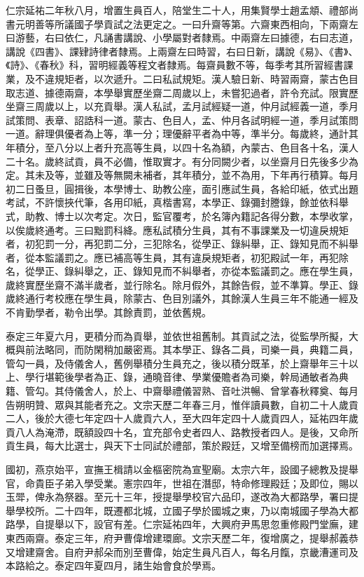 \begin{pinyinscope}
 仁宗延祐二年秋八月，增置生員百人，陪堂生二十人，用集賢學士趙孟頫、禮部尚書元明善等所議國子學貢試之法更定之。一曰升齋等第。六齋東西相向，下兩齋左曰游藝，右曰依仁，凡誦書講說、小學屬對者隸焉。中兩齋左曰據德，右曰志道，講說《四書》、課肄詩律者隸焉。上兩齋左曰時習，右曰日新，講說《易》、《書》、《詩》、《春秋》科，習明經義等程文者隸焉。每齋員數不等，每季考其所習經書課業，及不違規矩者，以次遞升。二曰私試規矩。漢人驗日新、時習兩齋，蒙古色目取志道、據德兩齋，本學舉實歷坐齋二周歲以上，未嘗犯過者，許令充試。限實歷坐齋三周歲以上，以充貢舉。漢人私試，孟月試經疑一道，仲月試經義一道，季月試策問、表章、詔誥科一道。蒙古、色目人，孟、仲月各試明經一道，季月試策問一道。辭理俱優者為上等，準一分；理優辭平者為中等，準半分。每歲終，通計其年積分，至八分以上者升充高等生員，以四十名為額，內蒙古、色目各十名，漢人二十名。歲終試貢，員不必備，惟取實才。有分同闕少者，以坐齋月日先後多少為定。其未及等，並雖及等無闕未補者，其年積分，並不為用，下年再行積算。每月初二日蚤旦，圓揖後，本學博士、助教公座，面引應試生員，各給印紙，依式出題考試，不許懷挾代筆，各用印紙，真楷書寫，本學正、錄彌封謄錄，餘並依科舉式，助教、博士以次考定。次日，監官覆考，於名簿內籍記各得分數，本學收掌，以俟歲終通考。三曰黜罰科絳。應私試積分生員，其有不事課業及一切違戾規矩者，初犯罰一分，再犯罰二分，三犯除名，從學正、錄糾舉，正、錄知見而不糾舉者，從本監議罰之。應已補高等生員，其有違戾規矩者，初犯殿試一年，再犯除名，從學正、錄糾舉之，正、錄知見而不糾舉者，亦從本監議罰之。應在學生員，歲終實歷坐齋不滿半歲者，並行除名。除月假外，其餘告假，並不準算。學正、錄歲終通行考校應在學生員，除蒙古、色目別議外，其餘漢人生員三年不能通一經及不肯勤學者，勒令出學。其餘責罰，並依舊規。



 泰定三年夏六月，更積分而為貢舉，並依世祖舊制。其貢試之法，從監學所擬，大概與前法略同，而防閑稍加嚴密焉。其本學正、錄各二員，司樂一員，典籍二員，管勾一員，及侍儀舍人，舊例舉積分生員充之，後以積分既革，於上齋舉年三十以上、學行堪範後學者為正、錄，通曉音律、學業優贍者為司樂，幹局通敏者為典籍、管勾。其侍儀舍人，於上、中齋舉禮儀習熟、音吐洪暢、曾掌春秋釋奠、每月告朔明贊、眾與其能者充之。文宗天歷二年春三月，惟伴讀員數，自初二十人歲貢二人，後於大德七年定四十人歲貢六人，至大四年定四十人歲貢四人，延祐四年歲貢八人為淹滯，既額設四十名，宜充部令史者四人、路教授者四人。是後，又命所貢生員，每大比選士，與天下士同試於禮部，策於殿廷，又增至備榜而加選擇焉。



 國初，燕京始平，宣撫王楫請以金樞密院為宣聖廟。太宗六年，設國子總教及提舉官，命貴臣子弟入學受業。憲宗四年，世祖在潛邸，特命修理殿廷；及即位，賜以玉斝，俾永為祭器。至元十三年，授提舉學校官六品印，遂改為大都路學，署曰提舉學校所。二十四年，既遷都北城，立國子學於國城之東，乃以南城國子學為大都路學，自提舉以下，設官有差。仁宗延祐四年，大興府尹馬思忽重修殿門堂廡，建東西兩齋。泰定三年，府尹曹偉增建環廊。文宗天歷二年，復增廣之，提舉郝義恭又增建齋舍。自府尹郝朵而別至曹偉，始定生員凡百人，每名月餼，京畿漕運司及本路給之。泰定四年夏四月，諸生始會食於學焉。




\end{pinyinscope}
